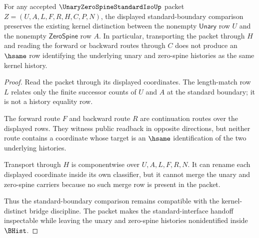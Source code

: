 \begin{theorem}
\label{thm:unary-zero-spine-standard-isomorphism-nonidentification-boundary}
For any accepted $\UnaryZeroSpineStandardIsoUp$ packet $Z=(U,A,L,F,R,H,C,P,N)$, the displayed standard-boundary comparison preserves the existing kernel distinction between the nonempty $\mathsf{Unary}$ row $U$ and the nonempty $\mathsf{ZeroSpine}$ row $A$. In particular, transporting the packet through $H$ and reading the forward or backward routes through $C$ does not produce an $\hsame$ row identifying the underlying unary and zero-spine histories as the same kernel history.
\end{theorem}
\begin{proof}
Read the packet through its displayed coordinates. The length-match row $L$ relates only the finite successor counts of $U$ and $A$ at the standard boundary; it is not a history equality row.

The forward route $F$ and backward route $R$ are continuation routes over the displayed rows. They witness public readback in opposite directions, but neither route contains a coordinate whose target is an $\hsame$ identification of the two underlying histories.

Transport through $H$ is componentwise over $U,A,L,F,R,N$. It can rename each displayed coordinate inside its own classifier, but it cannot merge the unary and zero-spine carriers because no such merge row is present in the packet.

Thus the standard-boundary comparison remains compatible with the kernel-distinct bridge discipline. The packet makes the standard-interface handoff inspectable while leaving the unary and zero-spine histories nonidentified inside $\BHist$.
\end{proof}

